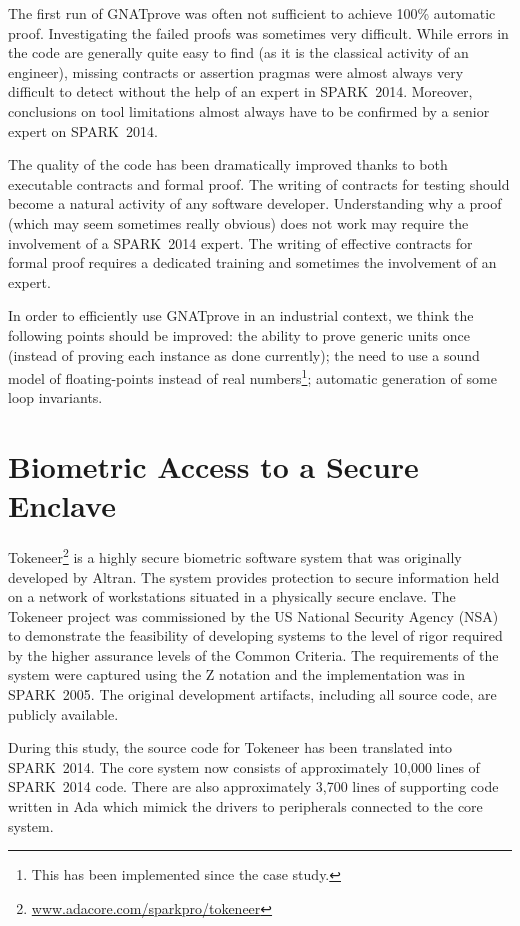\documentclass[10pt,a4paper,twocolumn]{article}
\newcommand{\gnatprove}{GNATprove\xspace}
\newcommand{\oldspark}{SPARK~2005\xspace}
\newcommand{\newspark}{SPARK~2014\xspace}
\begin{document}
The first run of \gnatprove was often not sufficient to achieve 100\%
automatic proof. Investigating the failed proofs was sometimes very
difficult. While errors in the code are generally quite easy to find
(as it is the classical activity of an engineer), missing contracts or
assertion pragmas were almost always very difficult to detect without
the help of an expert in \newspark. Moreover, conclusions on tool
limitations almost always have to be confirmed by a senior expert on
\newspark.

The quality of the code has been dramatically improved thanks to both
executable contracts and formal proof. The writing of contracts for
testing should become a natural activity of any software
developer. Understanding why a proof (which may seem sometimes really
obvious) does not work may require the involvement of a \newspark
expert. The writing of effective contracts for formal proof requires a
dedicated training and sometimes the involvement of an expert.

In order to efficiently use \gnatprove in an industrial context, we
think the following points should be improved: the ability to prove
generic units once (instead of proving each instance as done
currently); the need to use a sound model of floating-points instead
of real numbers\footnote{This has been implemented since the case study.};
automatic generation of some loop invariants.

\section{Biometric Access to a Secure Enclave}
\label{sec:tokeneer}

Tokeneer\footnote{\url{www.adacore.com/sparkpro/tokeneer}} is a highly
secure biometric software system that was originally developed by
Altran. The system provides protection to secure information held on a
network of workstations situated in a physically secure enclave. The
Tokeneer project was commissioned by the US National Security Agency
(NSA) to demonstrate the feasibility of developing systems to the
level of rigor required by the higher assurance levels of the Common
Criteria. The requirements of the system were captured using the Z
notation and the implementation was in \oldspark. The original
development artifacts, including all source code, are publicly
available.

During this study, the source code for Tokeneer has been translated
into \newspark. The core system now consists of approximately 10,000
lines of \newspark code. There are also approximately 3,700 lines of
supporting code written in Ada which mimick the drivers to peripherals
connected to the core system.
\end{document}
